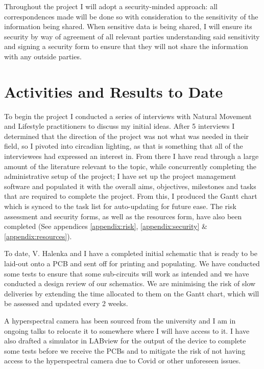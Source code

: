 \documentclass[twoside,twocolumn]{article}
\begin{document}
Throughout the project I will adopt a security-minded approach: all correspondences made will be done so with consideration to the sensitivity of the information being shared. When sensitive data is being shared, I will ensure its security by way of agreement of all relevant parties understanding said sensitivity and signing a security form to ensure that they will not share the information with any outside parties.


\section{Activities and Results to Date}
\label{sec:results}


To begin the project I conducted a series of interviews with Natural Movement and Lifestyle practitioners to discuss my initial ideas. After 5 interviews I determined that the direction of the project was not what was needed in their field, so I pivoted into circadian lighting, as that is something that all of the interviewees had expressed an interest in. From there I have read through a large amount of the literature relevant to the topic, while concurrently completing the administrative setup of the project; I have set up the project management software \cite{ClickUpProjectManagement2020} and populated it with the overall aims, objectives, milestones and tasks that are required to complete the project. From this, I produced the Gantt chart which is synced to the task list for auto-updating for future ease. The risk assessment and security forms, as well as the resources form, have also been completed (See appendices \ref{appendix:risk}, \ref{appendix:security} \& \ref{appendix:resources}).

To date, V. Halenka and I have a completed initial schematic that is ready to be laid-out onto a PCB and sent off for printing and populating. We have conducted some tests to ensure that some sub-circuits will work as intended and we have conducted a design review of our schematics. We are minimising the risk of slow deliveries by extending the time allocated to them on the Gantt chart, which will be assessed and updated every 2 weeks.

A hyperspectral camera has been sourced from the university and I am in ongoing talks to relocate it to somewhere where I will have access to it. I have also drafted a simulator in LABview for the output of the device to complete some tests before we receive the PCBs and to mitigate the risk of not having access to the hyperspectral camera due to Covid or other unforeseen issues.
\end{document}
